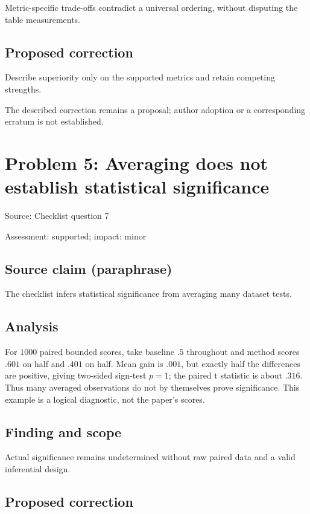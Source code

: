 \documentclass[11pt]{article}
\begin{document}
Metric-specific trade-offs contradict a universal ordering, without disputing the table measurements.

\subsection*{Proposed correction}

Describe superiority only on the supported metrics and retain competing strengths.

The described correction remains a proposal; author adoption or a corresponding erratum is not established.

\section*{Problem 5: Averaging does not establish statistical significance}

Source: Checklist question 7

Assessment: supported; impact: minor

\subsection*{Source claim (paraphrase)}

The checklist infers statistical significance from averaging many dataset tests.

\subsection*{Analysis}

For \(1000\) paired bounded scores, take baseline \(.5\) throughout and method scores \(.601\) on half and \(.401\) on half. Mean gain is \(.001\), but exactly half the differences are positive, giving two-sided sign-test \(p=1\); the paired t statistic is about \(.316\). Thus many averaged observations do not by themselves prove significance. This example is a logical diagnostic, not the paper’s scores.

\subsection*{Finding and scope}

Actual significance remains undetermined without raw paired data and a valid inferential design.

\subsection*{Proposed correction}
\end{document}
